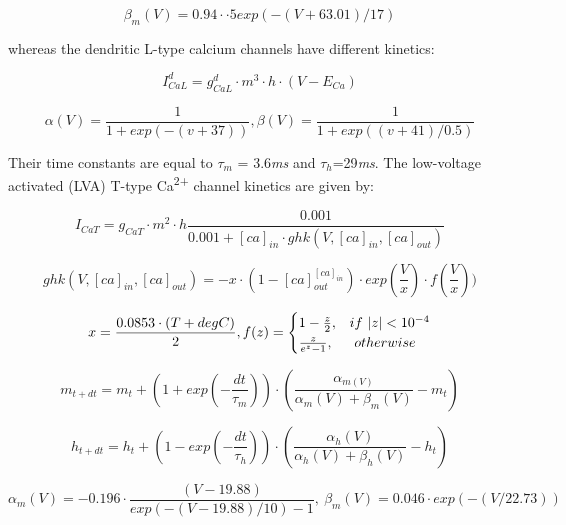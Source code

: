 \documentclass[12pt]{article}
\begin{document}
\begin{equation}
 \beta_m(V)=0.94 \cdot \cdot 5 exp(-(V+63.01)/17)
\end{equation}


whereas the dendritic L-type calcium channels have different kinetics: 


\begin{equation}
I_{CaL}^d= g_{CaL}^d \cdot m^3 \cdot h \cdot
(V-E_{Ca})
\end{equation}

\begin{equation}
\alpha(V)=\frac {1}{1+exp(-(v+37))},\beta(V)=\frac {1}{1+exp( (v+41)/0.5)}
\end{equation}

Their time constants are equal to $\tau_m$ = 3.6\textit{ms} and $\tau_h$=29\textit{ms}.
The low-voltage activated (LVA) T-type Ca\textsuperscript{2+} channel kinetics are given by:


\begin{equation}
I_{CaT}= g_{CaT}\cdot m^2\cdot
h\frac{0.001 }{0.001+[ca]_{in}\cdot
	ghk(V,[ca]_{in},[ca]_{out})}
\end{equation}

\begin{equation}
ghk(V, [ca]_{in}, [ca]_{out})=-x\cdot
(1 - [ca]_{out}^{[ca]_{in}})\cdot
exp(\frac {V}{x})\cdot f(\frac {V}{x}))
\end{equation}

\begin{equation}
x=\frac{0.0853\cdot (T+degC)}{2}, \\
f(z) = \begin{cases} 1-\frac {z}{2}, & if \ |z|<10^{-4} \\ \frac z{e^z-1}, & \  otherwise \ \end{cases}
\end{equation}

\begin{equation}
m_{t+dt}=m_t+(1+exp(-\frac{dt}{\tau_m}))\cdot
(\frac{\alpha_{m(V)}}{\alpha_m(V)+\beta_m(V)}-m_t)
\end{equation}

\begin{equation}
h_{t+dt}=h_t+(1-exp(-\frac{dt}{\tau_h}))\cdot
(\frac{\alpha_h(V)}{\alpha_h(V)+\beta_h(V)}-h_t)
\end{equation}

\begin{equation}
\alpha_m(V)=-0.196\cdot \frac{(V-19.88)}{exp(-(V-19.88)/10)-1}, \ \beta_m(V) = 0.046\cdot exp(-(V/22.73))
\end{equation}
\end{document}
